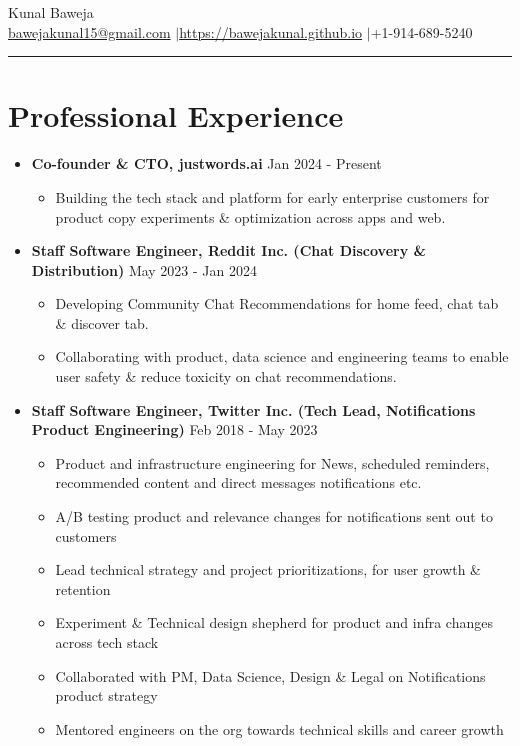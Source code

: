 \documentclass{article}
\def\name{Kunal Baweja}
\newcommand{\bi}{\vspace{-1mm}\begin{itemize}[align=left,leftmargin=*, rightmargin=80pt, labelindent=0pt,labelsep=2pt, label={-}, nosep]}
\newcommand{\ei}{\end{itemize}}
\begin{document}
\begin{center}
{\huge \name}\\
\href{mailto:bawejakunal15@gmail.com}{bawejakunal15@gmail.com} $|$\hspace{3pt}\href{https://bawejakunal.github.io}{https://bawejakunal.github.io} $|$\hspace{3pt}+1-914-689-5240
\end{center}

\hrule
\vspace{5pt}

\vspace{-1mm}
\section*{Professional Experience}
\begin{itemize}

    \item \textbf{Co-founder \& CTO, justwords.ai} {\hfill Jan 2024 - Present}
    \bi
        \item Building the tech stack and platform for early enterprise customers for product copy experiments \& optimization across apps and web.
    \ei

    \item \textbf{Staff Software Engineer, Reddit Inc. (Chat Discovery \& Distribution)} {\hfill May 2023 - Jan 2024}
    \bi
        \item Developing Community Chat Recommendations for home feed, chat tab \& discover tab.
        \item Collaborating with product, data science and engineering teams to enable user safety \& reduce toxicity on chat recommendations.
    \ei
    
    \item \textbf{Staff Software Engineer, Twitter Inc. (Tech Lead, Notifications Product Engineering)} {\hfill Feb 2018 - May 2023}
    \bi
      \item Product and infrastructure engineering for News, scheduled reminders, recommended content and direct messages notifications etc.
      \item A/B testing product and relevance changes for notifications sent out to customers
      \item Lead technical strategy and project prioritizations, for user growth \& retention
      \item Experiment \& Technical design shepherd for product and infra changes across tech stack
      \item Collaborated with PM, Data Science, Design \& Legal on Notifications product strategy
      \item Mentored engineers on the org towards technical skills and career growth
    \ei


\end{itemize}
\end{document}
